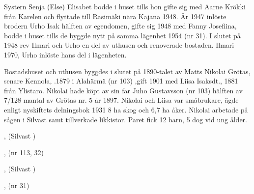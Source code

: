 Systern Senja (Else) Elisabet bodde i huset tills hon gifte sig med Aarne Krökki från Karelen och flyttade till Rasimäki nära Kajana 1948. År 1947 inlöste brodern Urho Isak hälften av egendomen, gifte sig 1948 med Fanny Josefiina, bodde i  huset tills de byggde nytt på samma lägenhet 1954 (nr 31). I slutet på 1948 rev Ilmari och Urho en del av uthusen och  renoverade bostaden.
Ilmari  1970, Urho inlöste hans del i lägenheten.


Bostadshuset och uthusen byggdes i slutet på 1890-talet av Matts Nikolai Grötas, senare Kennola, .1879 i Alahärmä (nr 103) ,gift 1901 med Liisa Isaksdt.,  1881 från Ylistaro. Nikolai hade köpt av sin far Juho Gustavsson (nr 103) hälften av 7/128 mantal av Grötas nr. 5 år 1897. Nikolai och Liisa var småbrukare, ägde enligt nyskiftets delningsbok 1931 8 ha skog och 6,7 ha åker. Nikolai arbetade på sågen i Silvast samt tillverkade likkistor. Paret fick 12 barn, 5 dog vid ung ålder.
\begin{jhchildren}
  \item {}
  \item {}
  \item {}
  \item {}
  \item {}, (Silvast    )
  \item {}, (nr 113, 32)
  \item {}
  \item {}, (Silvast   )
  \item {}
  \item {}
  \item {}, (nr 31)
  \item {}
\end{jhchildren}

